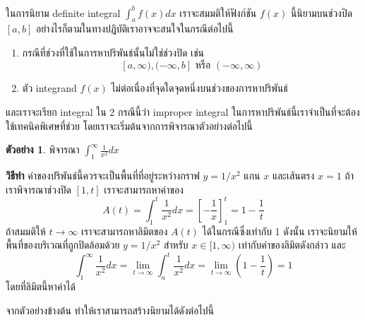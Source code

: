\documentclass[
]{book}
\theoremstyle{definition}
\theoremstyle{definition}
\newtheorem{example}{ตัวอย่าง}[chapter]
\theoremstyle{definition}
\theoremstyle{definition}
\theoremstyle{remark}
\begin{document}
ในการนิยาม definite integral \(\int_{a}^{b} f(x) dx\) เราจะสมมติให้ฟังก์ชัน
\(f(x)\) นี้นิยามบนช่วงปิด \([a,b]\) อย่างไรก็ตามในทางปฎิบัติเราอาจจะสนใจในกรณีต่อไปนี้

\begin{enumerate}
\def\labelenumi{\arabic{enumi}.}
\item
  กรณีที่ช่วงที่ใช้ในการหาปริพันธ์นั้นไม่ใช่ช่วงปิด เช่น
  \[[a, \infty) , (-\infty,b] \text{ หรือ } (-\infty,\infty)\]
\item
  ตัว integrand \(f(x)\) ไม่ต่อเนื่องที่จุดใดจุดหนึ่งบนช่วงของการหาปริพันธ์
\end{enumerate}

และเราจะเรียก integral ใน 2 กรณีนี้ว่า improper integral
ในการหาปริพันธ์นี้เราจำเป็นที่จะต้องใช้เทคนิคพิเศษที่ช่วย
โดยเราจะเริ่มต้นจากการพิจารณาตัวอย่างต่อไปนี้

\begin{example}
พิจารณา \(\int_{1}^{\infty} \frac{1}{x^2} dx\)
\end{example}

\textbf{วิธีทำ} ค่าของปริพันธ์นี้ควรจะเป็นพื้นที่ที่อยู่ระหว่างกราฟ \(y =  1/x^2\) แกน \(x\)
และเส้นตรง \(x=1\) ถ้าเราพิจารณาช่วงปิด \([1,t]\) เราจะสามารถหาค่าของ
\[A(t) = \int_{1}^{t} \frac{1}{x^2} dx =  \left[-\frac{1}{x}\right]_{1}^{t} = 1 - \frac{1}{t}\]
ถ้าสมมติให้ \(t \rightarrow \infty\) เราจะสามารถหาลิมิตของ \(A(t)\)
ได้ในกรณีซึ่งเท่ากับ 1 ดังนั้น เราจะนิยามให้พื้นที่ของบริเวณที่ถูกปิดล้อมด้วย \(y =  1/x^2\)
สำหรับ \(x \in [1,\infty)\) เท่ากับค่าของลิมิตดังกล่าว และ
\[\int_{1}^{\infty} \frac{1}{x^2} dx = \lim_{t \rightarrow \infty} \int_{a}^t \frac{1}{x^2}dx = 
    \lim_{t \rightarrow \infty} (1 - \frac{1}{t}) = 1\] โดยที่ลิมิตนี้หาค่าได้

จากตัวอย่างข้างต้น ทำให้เราสามารถสร้างนิยามได้ดังต่อไปนี้
\end{document}
